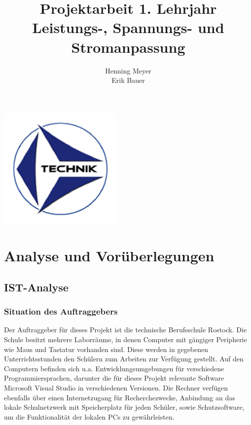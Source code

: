 \documentclass[a4paper]{article}
\title{Projektarbeit 1. Lehrjahr\\Leistungs-, Spannungs- und Stromanpassung}
\author{Henning Meyer\\Erik Bauer}
\begin{document}


\maketitle
\begin{center}
    \includegraphics[width=6cm]{img/logo}
\end{center}
\newpage
\tableofcontents
\newpage


\fontsize{11}{14}
\selectfont

\section{Analyse und Vorüberlegungen}

\subsection{IST-Analyse}

\subsubsection{Situation des Auftraggebers}

    Der Auftraggeber für dieses Projekt ist die technische Berufsschule Rostock.
    Die Schule besitzt mehrere Laborräume, in denen Computer mit gängiger Peripherie wie Maus und Tastatur vorhanden sind.
    Diese werden in gegebenen Unterrichtsstunden den Schülern zum Arbeiten zur Verfügung gestellt.
    Auf den Computern befinden sich u.a. Entwicklungsumgebungen für verschiedene Programmiersprachen, darunter die für dieses Projekt relevante Software \glqq Microsoft Visual Studio\grqq{} in verschiedenen Versionen.
    Die Rechner verfügen ebenfalls über einen Internetzugang für Recherchezwecke, Anbindung an das lokale Schulnetzwerk mit Speicherplatz für jeden Schüler, sowie Schutzsoftware, um die Funktionalität der lokalen PCs zu gewährleisten.
\end{document}
